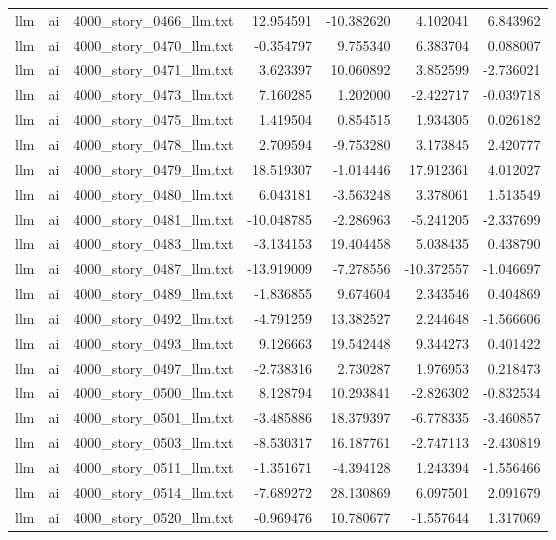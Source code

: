 \begin{longtable}{lllrrrr}
llm & ai & 4000\_story\_0466\_llm.txt & 12.954591 & -10.382620 & 4.102041 & 6.843962 \\
llm & ai & 4000\_story\_0470\_llm.txt & -0.354797 & 9.755340 & 6.383704 & 0.088007 \\
llm & ai & 4000\_story\_0471\_llm.txt & 3.623397 & 10.060892 & 3.852599 & -2.736021 \\
llm & ai & 4000\_story\_0473\_llm.txt & 7.160285 & 1.202000 & -2.422717 & -0.039718 \\
llm & ai & 4000\_story\_0475\_llm.txt & 1.419504 & 0.854515 & 1.934305 & 0.026182 \\
llm & ai & 4000\_story\_0478\_llm.txt & 2.709594 & -9.753280 & 3.173845 & 2.420777 \\
llm & ai & 4000\_story\_0479\_llm.txt & 18.519307 & -1.014446 & 17.912361 & 4.012027 \\
llm & ai & 4000\_story\_0480\_llm.txt & 6.043181 & -3.563248 & 3.378061 & 1.513549 \\
llm & ai & 4000\_story\_0481\_llm.txt & -10.048785 & -2.286963 & -5.241205 & -2.337699 \\
llm & ai & 4000\_story\_0483\_llm.txt & -3.134153 & 19.404458 & 5.038435 & 0.438790 \\
llm & ai & 4000\_story\_0487\_llm.txt & -13.919009 & -7.278556 & -10.372557 & -1.046697 \\
llm & ai & 4000\_story\_0489\_llm.txt & -1.836855 & 9.674604 & 2.343546 & 0.404869 \\
llm & ai & 4000\_story\_0492\_llm.txt & -4.791259 & 13.382527 & 2.244648 & -1.566606 \\
llm & ai & 4000\_story\_0493\_llm.txt & 9.126663 & 19.542448 & 9.344273 & 0.401422 \\
llm & ai & 4000\_story\_0497\_llm.txt & -2.738316 & 2.730287 & 1.976953 & 0.218473 \\
llm & ai & 4000\_story\_0500\_llm.txt & 8.128794 & 10.293841 & -2.826302 & -0.832534 \\
llm & ai & 4000\_story\_0501\_llm.txt & -3.485886 & 18.379397 & -6.778335 & -3.460857 \\
llm & ai & 4000\_story\_0503\_llm.txt & -8.530317 & 16.187761 & -2.747113 & -2.430819 \\
llm & ai & 4000\_story\_0511\_llm.txt & -1.351671 & -4.394128 & 1.243394 & -1.556466 \\
llm & ai & 4000\_story\_0514\_llm.txt & -7.689272 & 28.130869 & 6.097501 & 2.091679 \\
llm & ai & 4000\_story\_0520\_llm.txt & -0.969476 & 10.780677 & -1.557644 & 1.317069 \\

\end{longtable}
